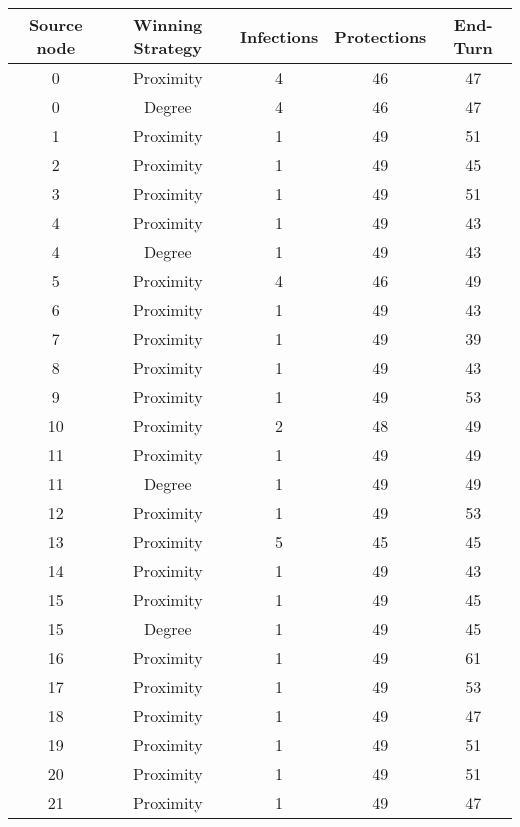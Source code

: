 \documentclass[results.tex]{subfiles}
\begin{document}
\begin{center}
  \begin{tabular}{| c || c | c | c | c |}
    \hline
    {\bfseries Source node} & {\bfseries Winning Strategy} & {\bfseries Infections} & {\bfseries Protections} & {\bfseries End-Turn} \\  %
    \hline\hline
    0 & Proximity & 4 & 46 & 47 \\ 
    \hline
    0 & Degree & 4 & 46 & 47 \\ 
    \hline
    1 & Proximity & 1 & 49 & 51 \\ 
    \hline
    2 & Proximity & 1 & 49 & 45 \\ 
    \hline
    3 & Proximity & 1 & 49 & 51 \\ 
    \hline
    4 & Proximity & 1 & 49 & 43 \\ 
    \hline
    4 & Degree & 1 & 49 & 43 \\ 
    \hline
    5 & Proximity & 4 & 46 & 49 \\ 
    \hline
    6 & Proximity & 1 & 49 & 43 \\ 
    \hline
    7 & Proximity & 1 & 49 & 39 \\ 
    \hline
    8 & Proximity & 1 & 49 & 43 \\ 
    \hline
    9 & Proximity & 1 & 49 & 53 \\ 
    \hline
    10 & Proximity & 2 & 48 & 49 \\ 
    \hline
    11 & Proximity & 1 & 49 & 49 \\ 
    \hline
    11 & Degree & 1 & 49 & 49 \\ 
    \hline
    12 & Proximity & 1 & 49 & 53 \\ 
    \hline
    13 & Proximity & 5 & 45 & 45 \\ 
    \hline
    14 & Proximity & 1 & 49 & 43 \\ 
    \hline
    15 & Proximity & 1 & 49 & 45 \\ 
    \hline
    15 & Degree & 1 & 49 & 45 \\ 
    \hline
    16 & Proximity & 1 & 49 & 61 \\ 
    \hline
    17 & Proximity & 1 & 49 & 53 \\ 
    \hline
    18 & Proximity & 1 & 49 & 47 \\ 
    \hline
    19 & Proximity & 1 & 49 & 51 \\ 
    \hline
    20 & Proximity & 1 & 49 & 51 \\ 
    \hline
    21 & Proximity & 1 & 49 & 47 \\ 

\end{tabular}
\end{center}
\end{document}
